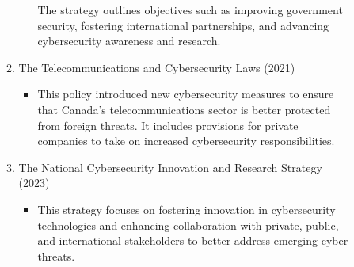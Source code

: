 \begin{enumerate}
\begin{description}
\begin{enumerate}[label=\arabic*.]
\begin{itemize}
					The strategy outlines objectives such as improving government security, fostering international partnerships, and advancing cybersecurity awareness and research.
			\end{itemize}
			\item The Telecommunications and Cybersecurity Laws (2021)
			\begin{itemize}
				\item This policy introduced new cybersecurity measures to ensure that Canada’s telecommunications sector is better protected from foreign threats.
					It includes provisions for private companies to take on increased cybersecurity responsibilities.
			\end{itemize}
			\item The National Cybersecurity Innovation and Research Strategy (2023)
			\begin{itemize}
				\item This strategy focuses on fostering innovation in cybersecurity technologies and enhancing collaboration with private, public, and international stakeholders to better address emerging cyber threats.
			\end{itemize}
        \end{enumerate}
    \end{description}
\end{enumerate}